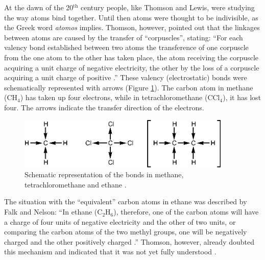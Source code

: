 At the dawn of the 20$^\mathrm{th}$ century people, like Thomson and Lewis, were studying the way atoms bind together. Until then atoms were thought to be indivisible, as the Greek word \textit{atomos} implies. Thomson, however, pointed out that the linkages between atoms are caused by the transfer of ``corpuscles'', stating: ``For each valency bond established between two atoms the transference of one corpuscle from the one atom to the other has taken place, the atom receiving the corpuscle acquiring a unit charge of negative electricity, the other by the loss of a corpuscle acquiring a unit charge of positive \cite{thomson}.'' These valency (electrostatic) bonds were schematically represented with arrows (Figure \ref{ch1.fig1}). The carbon atom in methane (CH$_4$) has taken up four electrons, while in tetrachloromethane (CCl$_4$), it has lost four. The arrows indicate the transfer direction of the electrons. 
\begin{figure}[htdp]
\center
\includegraphics[width=4in]{introduction/figures/figure1.eps}
\caption{Schematic representation of the bonds in methane, tetrachloromethane and ethane \cite{falk}.}
\label{ch1.fig1}
\end{figure}
The situation with the ``equivalent'' carbon atoms in ethane was described by Falk and Nelson: ``In ethane (C$_2$H$_6$), therefore, one of the carbon atoms will have a charge of four units of negative electricity and the other of two units, or comparing the carbon atoms of the two methyl groups, one will be negatively charged and the other positively charged \cite{falk}.'' Thomson, however, already doubted this mechanism and indicated that it was not yet fully understood \cite{thomson}.

